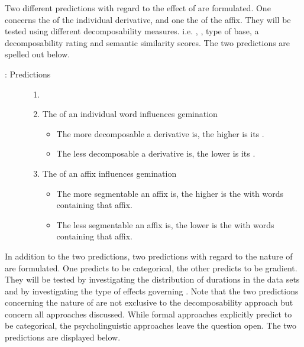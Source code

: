Two different predictions with regard to the effect of  are formulated. One concerns the  of the individual derivative, and one the  of the affix. They will be tested using different decomposability measures. i.e.  , , type of base, a decomposability rating and semantic similarity scores. The two predictions are spelled out below.\pagebreak

\largerpage
\begin{description}
\item[: Predictions]
\begin{enumerate}[leftmargin=*,label=\Alph*:]
    \item[]
 	\item The  of an individual word influences gemination
        \begin{itemize}[leftmargin=*]
        \item The more decomposable a derivative is, the higher is its .
        \item The less decomposable a derivative is, the lower is its .
        \end{itemize}
        
    \item The  of an affix influences gemination
        \begin{itemize}[leftmargin=*]
        \item The more segmentable an affix is, the higher is the  with words containing that affix. 
        \item The less segmentable an affix is, the lower is the  with words containing that affix.
        \end{itemize}
\end{enumerate}
\end{description}

In addition to the two  predictions, two predictions with regard to the nature of  are formulated. One predicts  to be categorical, the other predicts  to be gradient. They will be tested by investigating the distribution of durations in the data sets and by investigating the type of effects governing . Note that the two predictions concerning the nature of  are not exclusive to the decomposability approach but concern all approaches discussed. While formal approaches explicitly predict  to be categorical, the psycholinguistic approaches leave the question open. The two predictions are displayed below.


